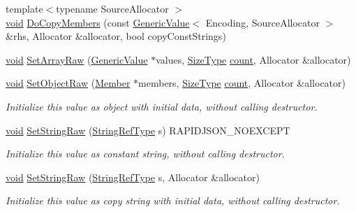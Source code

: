 \begin{DoxyCompactItemize}
\item 
{\footnotesize template$<$typename Source\+Allocator $>$ }\\\hyperlink{imgui__impl__opengl3__loader_8h_ac668e7cffd9e2e9cfee428b9b2f34fa7}{void} \hyperlink{classGenericValue_a17e90627a90a4e97e8425e0ca4a22cbb}{Do\+Copy\+Members} (const \hyperlink{classGenericValue}{Generic\+Value}$<$ Encoding, Source\+Allocator $>$ \&rhs, Allocator \&allocator, bool copy\+Const\+Strings)
\item 
\hyperlink{imgui__impl__opengl3__loader_8h_ac668e7cffd9e2e9cfee428b9b2f34fa7}{void} \hyperlink{classGenericValue_a8f5f309065479de40a16cf28a340da65}{Set\+Array\+Raw} (\hyperlink{classGenericValue}{Generic\+Value} $\ast$values, \hyperlink{rapidjson_8h_a5ed6e6e67250fadbd041127e6386dcb5}{Size\+Type} \hyperlink{imgui__impl__opengl3__loader_8h_a619bc20e8198de3bd3f3d7fc34de66b2}{count}, Allocator \&allocator)
\item 
\hyperlink{imgui__impl__opengl3__loader_8h_ac668e7cffd9e2e9cfee428b9b2f34fa7}{void} \hyperlink{classGenericValue_a26c8ec7d68858df1038506df7fcff22d}{Set\+Object\+Raw} (\hyperlink{classGenericValue_a7ccf27c44058b4c11c3efc6473afb886}{Member} $\ast$members, \hyperlink{rapidjson_8h_a5ed6e6e67250fadbd041127e6386dcb5}{Size\+Type} \hyperlink{imgui__impl__opengl3__loader_8h_a619bc20e8198de3bd3f3d7fc34de66b2}{count}, Allocator \&allocator)
\begin{DoxyCompactList}\small\item\em Initialize this value as object with initial data, without calling destructor. \end{DoxyCompactList}\item 
\hyperlink{imgui__impl__opengl3__loader_8h_ac668e7cffd9e2e9cfee428b9b2f34fa7}{void} \hyperlink{classGenericValue_a1451603922dcdf34976f125dc60f70ee}{Set\+String\+Raw} (\hyperlink{classGenericValue_a32e0f30ee278072374c8168b14d3317f}{String\+Ref\+Type} s) R\+A\+P\+I\+D\+J\+S\+O\+N\+\_\+\+N\+O\+E\+X\+C\+E\+PT
\begin{DoxyCompactList}\small\item\em Initialize this value as constant string, without calling destructor. \end{DoxyCompactList}\item 
\hyperlink{imgui__impl__opengl3__loader_8h_ac668e7cffd9e2e9cfee428b9b2f34fa7}{void} \hyperlink{classGenericValue_ad3d91db36dfdbfc1af40a79aae07723c}{Set\+String\+Raw} (\hyperlink{classGenericValue_a32e0f30ee278072374c8168b14d3317f}{String\+Ref\+Type} s, Allocator \&allocator)
\begin{DoxyCompactList}\small\item\em Initialize this value as copy string with initial data, without calling destructor. \end{DoxyCompactList}\item 

\end{DoxyCompactItemize}
